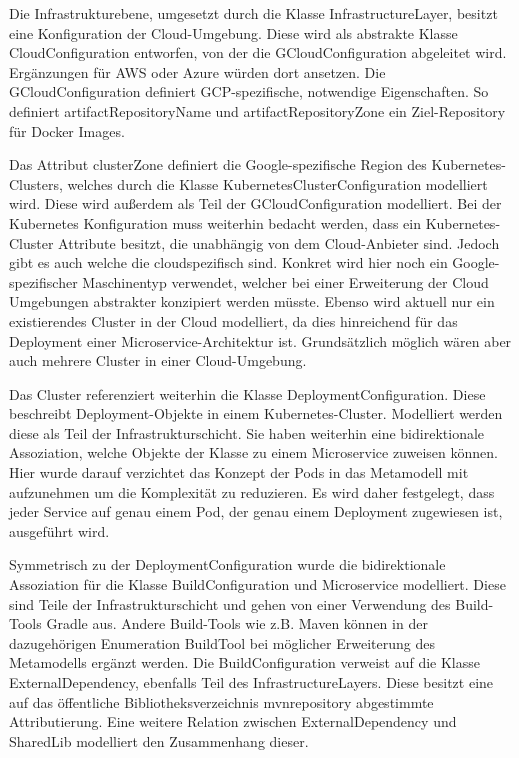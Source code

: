 \newpage

Die Infrastrukturebene, umgesetzt durch die Klasse \glqq InfrastructureLayer\grqq{}, besitzt eine Konfiguration der Cloud-Umgebung. Diese wird als abstrakte Klasse \glqq CloudConfiguration\grqq{} entworfen, von der die \glqq GCloudConfiguration\grqq{} abgeleitet wird. Ergänzungen für AWS oder Azure würden dort ansetzen. Die GCloudConfiguration definiert GCP-spezifische, notwendige Eigenschaften. So definiert \glqq artifactRepositoryName\grqq{} und \glqq artifactRepositoryZone\grqq{} ein Ziel-Repository für Docker Images.

Das Attribut \glqq clusterZone\grqq{} definiert die Google-spezifische Region des Kubernetes-Clusters, welches durch die Klasse \glqq KubernetesClusterConfiguration\grqq{} modelliert wird. Diese wird außerdem als Teil der GCloudConfiguration modelliert. Bei der Kubernetes Konfiguration muss weiterhin bedacht werden, dass ein Kubernetes-Cluster Attribute besitzt, die unabhängig von dem Cloud-Anbieter sind. Jedoch gibt es auch welche die cloudspezifisch sind. Konkret wird hier noch ein Google-spezifischer Maschinentyp verwendet, welcher bei einer Erweiterung der Cloud Umgebungen abstrakter konzipiert werden müsste. Ebenso wird aktuell nur ein existierendes Cluster in der Cloud modelliert, da dies hinreichend für das Deployment einer Microservice-Architektur ist. Grundsätzlich möglich wären aber auch mehrere Cluster in einer Cloud-Umgebung.

Das Cluster referenziert weiterhin die Klasse \glqq DeploymentConfiguration\grqq{}. Diese beschreibt Deployment-Objekte in einem Kubernetes-Cluster. Modelliert werden diese als Teil der Infrastrukturschicht. Sie haben weiterhin eine bidirektionale Assoziation, welche Objekte der Klasse zu einem Microservice zuweisen können. Hier wurde darauf verzichtet das Konzept der Pods in das Metamodell mit aufzunehmen um die Komplexität zu reduzieren. Es wird daher festgelegt, dass jeder Service auf genau einem Pod, der genau einem Deployment zugewiesen ist, ausgeführt wird.

Symmetrisch zu der DeploymentConfiguration wurde die bidirektionale Assoziation für die Klasse \glqq BuildConfiguration\grqq{} und Microservice modelliert. Diese sind Teile der Infrastrukturschicht und gehen von einer Verwendung des Build-Tools Gradle aus. Andere Build-Tools wie z.B. Maven können in der dazugehörigen Enumeration \glqq BuildTool\grqq{} bei möglicher Erweiterung des Metamodells ergänzt werden. Die BuildConfiguration verweist auf die Klasse \glqq ExternalDependency\grqq, ebenfalls Teil des InfrastructureLayers. Diese besitzt eine auf das öffentliche Bibliotheksverzeichnis \glqq mvnrepository\grqq{} abgestimmte Attributierung. Eine weitere Relation zwischen ExternalDependency und SharedLib modelliert den Zusammenhang dieser.

